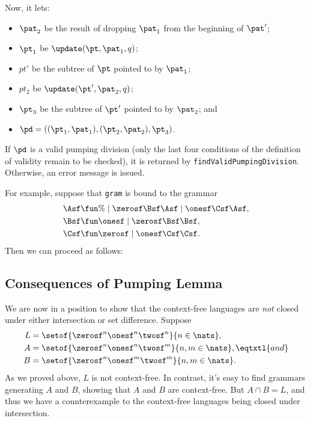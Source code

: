 Now, it lets:
\begin{itemize}
\item $\pat_2$ be the result of dropping $\pat_1$ from the beginning of
  $\pat'$;

\item $\pt_1$ be $\update(\pt, \pat_1, q)$;

\item $pt'$ be the subtree of $\pt$ pointed to by $\pat_1$;

\item $pt_2$ be $\update(\pt', \pat_2, q)$;

\item $\pt_3$ be the subtree of $\pt'$ pointed to by $\pat_2$; and

\item $\pd = ((\pt_1, \pat_1), (\pt_2, \pat_2), \pt_3)$.
\end{itemize}
If $\pd$ is a valid pumping division (only the last four conditions of
the definition of validity remain to be checked), it is returned by
\texttt{findValidPumpingDivision}. Otherwise, an error message is
issued.

For example, suppose that \texttt{gram} is bound to the
grammar
\begin{align*}
\Asf &\fun \% \mid \zerosf\Bsf\Asf \mid \onesf\Csf\Asf , \\
\Bsf &\fun \onesf \mid \zerosf\Bsf\Bsf , \\
\Csf &\fun \zerosf \mid \onesf\Csf\Csf .
\end{align*}
Then we can proceed as follows:


\subsection{Consequences of Pumping Lemma}

We are now in a position to show that the context-free languages are
\emph{not} closed under either intersection or set difference.
Suppose
\begin{align*}
  L &= \setof{\zerosf^n\onesf^n\twosf^n}{n\in\nats} , \\
  A &= \setof{\zerosf^n\onesf^n\twosf^m}{n,m\in\nats} , \eqtxtl{and} \\
  B &= \setof{\zerosf^n\onesf^m\twosf^m}{n,m\in\nats} .
\end{align*}
As we proved above, $L$ is not context-free.  In contrast, it's easy
to find grammars generating $A$ and $B$, showing that $A$ and $B$ are
context-free.  But $A\cap B=L$, and thus we have a counterexample to
the context-free languages being closed under intersection.

